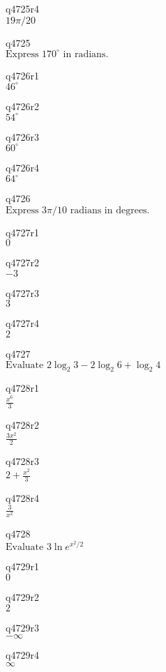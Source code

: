 q4725r4\\
\(\displaystyle 19\pi/20 \)

q4725\\
\(\displaystyle \text{Express } 170^{\circ} \text{ in radians.} \)

q4726r1\\
\(\displaystyle 46^{\circ} \)

q4726r2\\
\(\displaystyle 54^{\circ} \)

q4726r3\\
\(\displaystyle 60^{\circ} \)

q4726r4\\
\(\displaystyle 64^{\circ} \)

q4726\\
\(\displaystyle \text{Express } 3\pi/10 \text{ radians in degrees.} \)

q4727r1\\
\(\displaystyle 0 \)

q4727r2\\
\(\displaystyle -3 \)

q4727r3\\
\(\displaystyle 3 \)

q4727r4\\
\(\displaystyle 2 \)

q4727\\
\(\displaystyle \text{Evaluate } 2\log_2 3 - 2\log_2 6 + \log_2 4 \)

q4728r1\\
\(\displaystyle \frac{x^6}{3} \)

q4728r2\\
\(\displaystyle \frac{3x^2}{2} \)

q4728r3\\
\(\displaystyle 2 + \frac{x^2}{3} \)

q4728r4\\
\(\displaystyle \frac{3}{x^2} \)

q4728\\
\(\displaystyle \text{Evaluate } 3\ln e^{x^2/2} \)

q4729r1\\
\(\displaystyle 0 \)

q4729r2\\
\(\displaystyle 2 \)

q4729r3\\
\(\displaystyle -\infty \)

q4729r4\\
\(\displaystyle \infty \)

